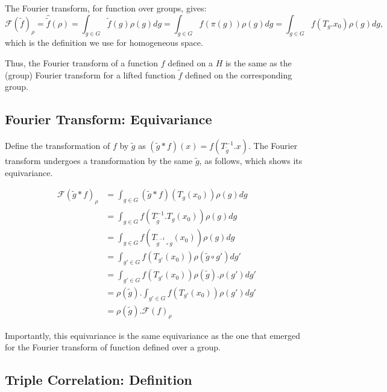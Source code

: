 \documentclass{article}
\begin{document}
The Fourier transform, for function over groups, gives:
\begin{equation}
\mathcal{F}(\tilde{f})_\rho
=
\widehat{\tilde{f}}(\rho)
=
\int_{g \in G} \tilde{f}(g) \rho(g)dg
=
\int_{g \in G} f(\pi(g)) \rho(g)dg
=
\int_{g \in G} f(T_g.x_0) \rho(g)dg ,
\end{equation}
which is the definition we use for homogeneous space.

Thus, the Fourier transform of a function $f$ defined on a $H$ is the same as the (group) Fourier transform for a lifted function $\tilde f$ defined on the corresponding group.

\subsection{Fourier Transform: Equivariance}

Define the transformation of $f$ by $\tilde g$ as $(\tilde{g} \ast f)(x) = f(T_{\tilde g}^{-1}.x)$. The Fourier transform undergoes a transformation by the same $\tilde g$, as follows, which shows its equivariance.

\vspace{-0.7cm}
\begin{align*}
  \mathcal{F}(\tilde{g} \ast f)_\rho
  &=  \int_{g \in G} (\tilde{g} \ast f)(T_g(x_0))\rho(g) dg \\
  &=  \int_{g \in G} f(T_{\tilde g}^{-1}.T_g(x_0))\rho(g) dg \\
  &=  \int_{g \in G} f(T_{\tilde g^{-1}\circ g}(x_0))\rho(g) dg \\
  &=  \int_{g' \in G} f(T_{g'}(x_0))\rho(\tilde{g}\circ g') dg' \\
  &=  \int_{g' \in G} f(T_{g'}(x_0))\rho(\tilde{g}).\rho(g') dg' \\
  &=  \rho(\tilde{g}) . \int_{g' \in G} f(T_{g'}(x_0))\rho(g') dg' \\
  &=  \rho(\tilde{g}) .\mathcal{F}(f)_\rho
\end{align*}
\vspace{-0.7cm}

Importantly, this equivariance is the same equivariance as the one that emerged for the Fourier transform of function defined over a group.

\subsection{Triple Correlation: Definition}
\end{document}
